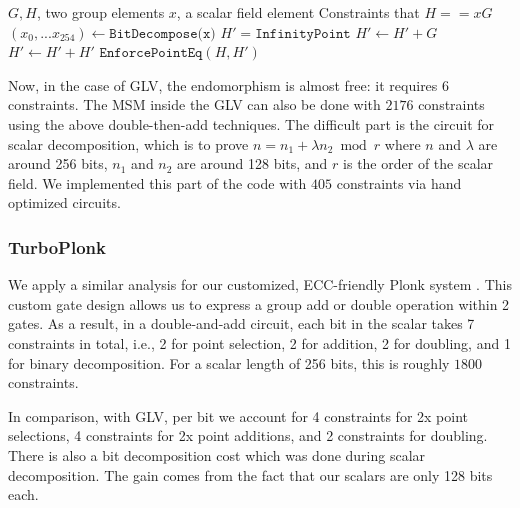 \documentclass[version=preprint]{iacrcc}
\begin{document}
\begin{algorithm}
  \caption{Double-and-Add algorithm in circuit}\label{alg:double-and-add}
  \begin{algorithmic}
  \Require $G, H$, two group elements
  \Require $x$, a scalar field element
  \Ensure Constraints that $H == xG$
  \State $(x_0,...x_{254})\gets \texttt{BitDecompose(x)}$ 
  \State $H' = \texttt{InfinityPoint}$
             
      \State  $H' \gets H' + G$   
    \EndIf
    \State $H' \gets H' + H'$      
  \EndFor
  \State $\texttt{EnforcePointEq}(H, H')$ 
  \end{algorithmic}
\end{algorithm}

Now, in the case of GLV,
the endomorphism is almost free: it requires 
6 constraints. The MSM inside the GLV can also be done 
with $2176$ constraints using the above double-then-add
techniques.
The difficult part is the circuit for scalar decomposition,
which is to prove $n = n_1 +\lambda n_2 \bmod r$ where
$n$ and $\lambda$ are around 256 bits,
$n_1$ and $n_2$ are around 128 bits, and
$r$
is the order of the scalar field.
We implemented this part of the code with $405$ constraints
via hand optimized circuits.

\subsubsection{TurboPlonk}
We apply a similar analysis for our customized, ECC-friendly 
Plonk system \cite{cryptoeprint:2022/802}. 
This custom gate design allows us to express a group add or 
double operation within 2 gates. 
As a result,
in a double-and-add circuit, each bit in the scalar
takes 7 constraints in total, i.e., 2 for point selection, 2 
for addition, 2 for doubling, and 1 for binary decomposition.
For a scalar length of 256 bits, this is roughly $1800$ constraints.

In comparison, with GLV, per bit we account for 4 constraints for 2x point selections,
4 constraints for 2x point additions, and 2 constraints for doubling.
There is also a bit decomposition cost which was done during scalar
decomposition. The gain comes from the fact that our scalars are only
128 bits each.
\end{document}
